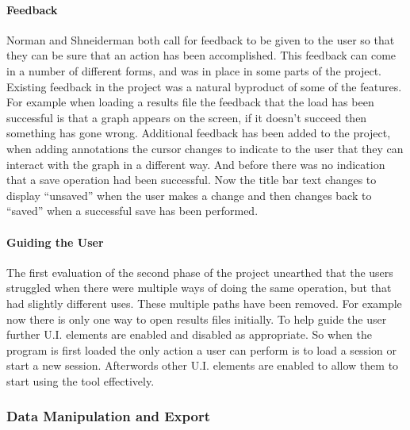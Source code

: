 \paragraph{Feedback}
Norman and Shneiderman both call for feedback to be given to the user so that they can be sure that an action has been accomplished.  This feedback can come in a number of different forms, and was in place in some parts of the project.
Existing feedback in the project was a natural byproduct of some of the features.  For example when loading a results file the feedback that the load has been successful is that a graph appears on the screen, if it doesn't succeed then something has gone wrong.  Additional feedback has been added to the project, when adding annotations the cursor changes to indicate to the user that they can interact with the graph in a different way.  And before there was no indication that a save operation had been successful.  Now the title bar text changes to display ``unsaved'' when the user makes a change and then changes back to ``saved'' when a successful save has been performed.

\paragraph{Guiding the User}

The first evaluation of the second phase of the project unearthed that the users struggled when there were multiple ways of doing the same operation, but that had slightly different uses.  These multiple paths have been removed.  For example now there is only one way to open results files initially.  To help guide the user further U.I. elements are enabled and disabled as appropriate.  So when the program is first loaded the only action a user can perform is to load a session or start a new session.  Afterwords other U.I. elements are enabled to allow them to start using the tool effectively.

\subsubsection{Data Manipulation and Export}
